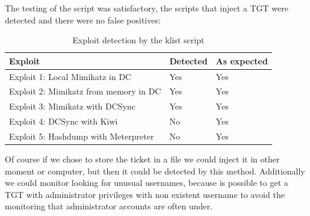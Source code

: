 \linej
\linej
The testing of the script was satisfactory, the scripts that inject a TGT were detected and there were no false positives:
\begin{table}[H]
	\centering
	\begin{tabular}{|l|l|l|}
		\hline
		\rowcolor{gray!30}
		Exploit & Detected & As expected \\ \hline
		Exploit 1: Local Mimikatz in DC& \cellcolor{green!60}Yes& \cellcolor{green!60}Yes\\ \hline
		Exploit 2: Mimikatz from memory in DC& \cellcolor{green!60}Yes& \cellcolor{green!60}Yes\\ \hline
		Exploit 3: Mimikatz with DCSync& \cellcolor{green!60}Yes& \cellcolor{green!60}Yes\\ \hline
		Exploit 4: DCSync with Kiwi& \cellcolor{red!60}No& \cellcolor{green!60}Yes\\ \hline
		Exploit 5: Hashdump with Meterpreter& \cellcolor{red!60}No& \cellcolor{green!60}Yes\\ \hline
	\end{tabular}
	\caption{Exploit detection by the klist script}
\end{table}
Of course if we chose to store the ticket in a file we could inject it in other moment or computer, but then it could be detected by this method.
\linej
\linej
Additionally we could monitor looking for unusual usernames, because is possible to get a TGT with administrator privileges with non existent username to avoid the monitoring that administrator accounts are often under.

